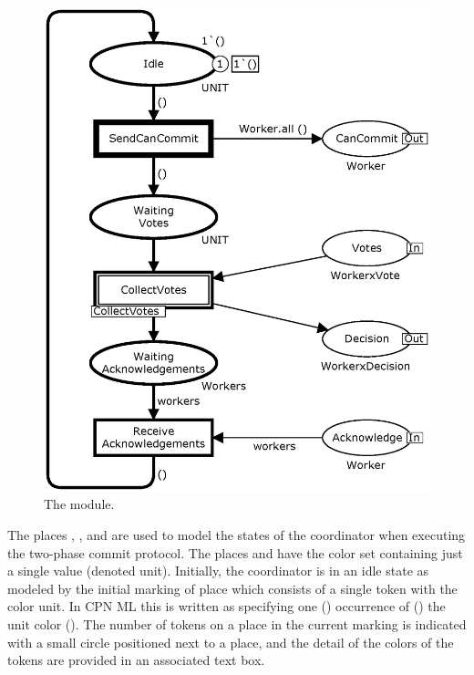 \begin{figure}[]
\centering
\includegraphics[scale=.43]{figures/Coordinator.eps}
\caption{The  module.}
\label{fig:coordinator}
\end{figure}



The places , , and
 are used to model the states of the
coordinator when executing the two-phase commit protocol. The places
 and  have the color set
 containing just a single value \smlcode{()} (denoted
unit). Initially, the coordinator is in an idle state as modeled by
the initial marking of place  which consists of a single
token with the color unit. In CPN ML this is written as
 specifying one () occurrence of
() the unit color (\smlcode{()}).  The number of tokens on
a place in the current marking is indicated with a small circle
positioned next to a place, and the detail of the colors of the tokens
are provided in an associated text box.

